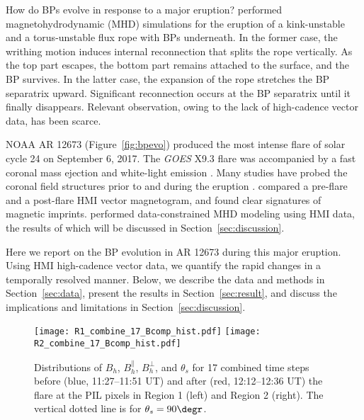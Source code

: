 \documentclass[times,twocolumn]{aastex631}
\begin{document}
\begin{CJK*}{UTF8}{gbsn}
How do BPs evolve in response to a major eruption? \citet{fan2007} performed magnetohydrodynamic (MHD) simulations for the eruption of a kink-unstable and a torus-unstable flux rope with BPs underneath. In the former case, the writhing motion induces internal reconnection that splits the rope vertically. As the top part escapes, the bottom part remains attached to the surface, and the BP survives. In the latter case, the expansion of the rope stretches the BP separatrix upward. Significant reconnection occurs at the BP separatrix until it finally disappears. Relevant observation, owing to the lack of high-cadence vector data, has been scarce.

NOAA AR 12673 (Figure~\ref{fig:bpevo}) produced the most intense flare of solar cycle 24 on September 6, 2017. The \textit{GOES} X9.3 flare was accompanied by a fast coronal mass ejection \citep{shencl2018} and white-light emission \citep{svanda2018}. Many studies have probed the coronal field structures prior to and during the eruption \citep{yangsh2017,zoup2020,inoue2021}. \citet{petrie2019} compared a pre-flare and a post-flare HMI vector magnetogram, and found clear signatures of magnetic imprints. \citet{jiang2018} performed data-constrained MHD modeling using HMI data, the results of which will be discussed in Section~\ref{sec:discussion}.

Here we report on the BP evolution in AR 12673 during this major eruption. Using HMI high-cadence vector data, we quantify the rapid changes in a temporally resolved manner. Below, we describe the data and methods in Section~\ref{sec:data}, present the results in Section~\ref{sec:result}, and discuss the implications and limitations in Section~\ref{sec:discussion}.


\begin{figure*}[t!]
\centering
\texttt{[image: R1\_combine\_17\_Bcomp\_hist.pdf]}
\hspace{2mm}
\texttt{[image: R2\_combine\_17\_Bcomp\_hist.pdf]}
\caption{Distributions of $B_h$, $B_h^\parallel$, $B_h^\perp$, and $\theta_s$ for 17 combined time steps before (blue, 11:27--11:51 UT) and after (red, 12:12--12:36 UT) the flare at the PIL pixels in Region 1 (left) and Region 2 (right). The vertical dotted line is for $\theta_s=90\degr$.}
\label{fig:Bhist}
\end{figure*}


\end{CJK*}
\end{document}
